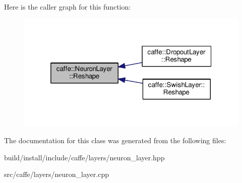 Here is the caller graph for this function\+:
\nopagebreak
\begin{figure}[H]
\begin{center}
\leavevmode
\includegraphics[width=319pt]{classcaffe_1_1_neuron_layer_a6d0facf4a5e6f459cf1cb8b28d945790_icgraph}
\end{center}
\end{figure}


The documentation for this class was generated from the following files\+:\begin{DoxyCompactItemize}
\item 
build/install/include/caffe/layers/neuron\+\_\+layer.\+hpp\item 
src/caffe/layers/neuron\+\_\+layer.\+cpp\end{DoxyCompactItemize}
